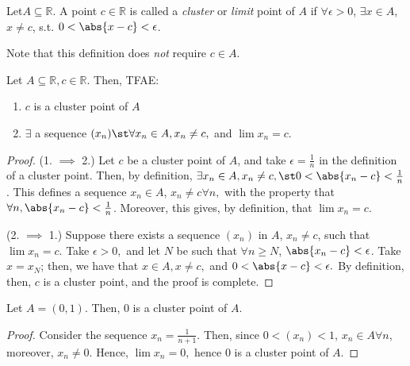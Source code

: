 \documentclass[12pt]{article}
\begin{document}
\begin{definition}
  Let\footnotemark $A \subseteq \mathbb{R}$. A point $c \in \mathbb{R}$ is called a \emph{cluster} or \emph{limit} point of $A$ if $\forall \epsilon > 0$, $\exists x \in A$, $x \neq c$, s.t. $0 < \abs{x-c} < \epsilon$.
\end{definition}

\begin{remark}
  Note that this definition does \emph{not} require $c \in A$.
\end{remark}

\begin{proposition}
  Let $A \subseteq \mathbb{R}, c \in \mathbb{R}$. Then, TFAE:
  \begin{enumerate}
    \item $c$ is a cluster point of $A$
    \item $\exists$ a sequence $(x_n) \st \forall x_n \in A, x_n \neq c,$ and $\lim x_{n} = c$.
  \end{enumerate}
\end{proposition}

\begin{proof}
(1. $\implies$ 2.) Let $c$ be a cluster point of $A$, and take $\epsilon = \frac{1}{n}$ in the definition of a cluster point. Then, by definition, $\exists x_n \in A, x_n \neq c, \st 0 < \abs{x_n - c} < \frac{1}{n}$. This defines a sequence $x_n \in A$, $x_n \neq c \forall n,$ with the property that $\forall n, \abs{x_n - c} < \frac{1}{n}$. Moreover, this gives, by definition, that $\lim x_n = c$.

(2. $\implies$ 1.) Suppose there exists a sequence $(x_n)$ in $A$, $x_n \neq c$, such that $\lim x_n = c$. Take $\epsilon > 0,$ and let $N$ be such that $\forall n \geq N$, $\abs{x_n - c} < \epsilon$. Take $x = x_N$; then, we have that $x \in A, x\neq c,$ and $0 < \abs{x-c} < \epsilon.$ By definition, then, $c$ is a cluster point, and the proof is complete. 
\end{proof}

\begin{example}
  Let $A = (0,1)$. Then, $0$ is a cluster point of $A$.
  \begin{proof}
    Consider the sequence $x_n = \frac{1}{n+1}$. Then, since $0<(x_n)<1$, $x_n \in A \forall n$, moreover, $x_n \neq 0$. Hence, $\lim x_n = 0,$ hence $0$ is a cluster point of $A$.
  \end{proof}
\end{example}
\end{document}
